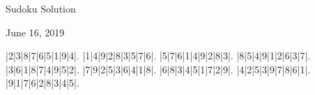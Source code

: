 \documentclass{article}
\begin{document}
\begin{center}
\Huge{Sudoku Solution}
\end{center}
\begin{center}
\Large{June 16, 2019}
\end{center}
\begin{sudoku}
|2|3|8|7|6|5|1|9|4|.
|1|4|9|2|8|3|5|7|6|.
|5|7|6|1|4|9|2|8|3|.
|8|5|4|9|1|2|6|3|7|.
|3|6|1|8|7|4|9|5|2|.
|7|9|2|5|3|6|4|1|8|.
|6|8|3|4|5|1|7|2|9|.
|4|2|5|3|9|7|8|6|1|.
|9|1|7|6|2|8|3|4|5|.
\end{sudoku}
\end{document}
